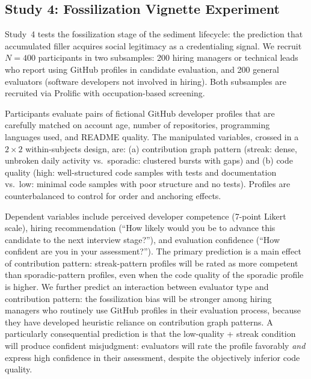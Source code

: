 \documentclass[12pt]{article}
\begin{document}
\subsection{Study 4: Fossilization Vignette Experiment}
\label{sec:study4}

Study~4 tests the fossilization stage of the sediment lifecycle: the prediction that accumulated filler acquires social legitimacy as a credentialing signal. We recruit $N = 400$ participants in two subsamples: 200 hiring managers or technical leads who report using GitHub profiles in candidate evaluation, and 200 general evaluators (software developers not involved in hiring). Both subsamples are recruited via Prolific with occupation-based screening.

Participants evaluate pairs of fictional GitHub developer profiles that are carefully matched on account age, number of repositories, programming languages used, and README quality. The manipulated variables, crossed in a $2 \times 2$ within-subjects design, are: (a) contribution graph pattern (streak: dense, unbroken daily activity vs.\ sporadic: clustered bursts with gaps) and (b) code quality (high: well-structured code samples with tests and documentation vs.\ low: minimal code samples with poor structure and no tests). Profiles are counterbalanced to control for order and anchoring effects.

Dependent variables include perceived developer competence (7-point Likert scale), hiring recommendation (``How likely would you be to advance this candidate to the next interview stage?''), and evaluation confidence (``How confident are you in your assessment?''). The primary prediction is a main effect of contribution pattern: streak-pattern profiles will be rated as more competent than sporadic-pattern profiles, even when the code quality of the sporadic profile is higher. We further predict an interaction between evaluator type and contribution pattern: the fossilization bias will be stronger among hiring managers who routinely use GitHub profiles in their evaluation process, because they have developed heuristic reliance on contribution graph patterns. A particularly consequential prediction is that the low-quality + streak condition will produce confident misjudgment: evaluators will rate the profile favorably \emph{and} express high confidence in their assessment, despite the objectively inferior code quality.

\end{document}
